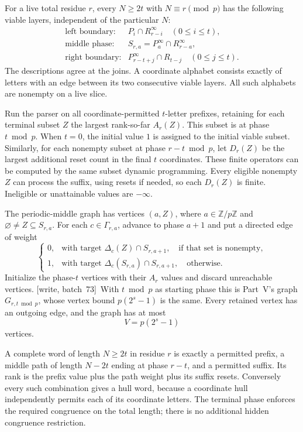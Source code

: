 \documentclass[11pt,letterpaper]{article}
\theoremstyle{definition}
\theoremstyle{remark}
\newcommand{\wsevthree}{\textup{[write, batch~73]}}
\begin{document}
For a live total residue $r$, every $N\ge2t$ with $N\equiv r\pmod p$ has the following viable layers, independent of the particular $N$:
\[
 \begin{array}{ll}
 \text{left boundary:}&P_i\cap R_{r-i}^{\infty}\quad(0\le i\le t),\\[2pt]
 \text{middle phase:}&S_{r,a}=P_a^{\infty}\cap R_{r-a}^{\infty},\\[2pt]
 \text{right boundary:}&P_{r-t+j}^{\infty}\cap R_{t-j}\quad(0\le j\le t).
 \end{array}
\]
The descriptions agree at the joins. A coordinate alphabet consists exactly of letters with an edge between its two consecutive viable layers. All such alphabets are nonempty on a live slice.

Run the parser on all coordinate-permitted $t$-letter prefixes, retaining for each terminal subset $Z$ the largest rank-so-far $A_r(Z)$. This subset is at phase $t\bmod p$. When $t=0$, the initial value $1$ is assigned to the initial viable subset. Similarly, for each nonempty subset at phase $r-t\bmod p$, let $D_r(Z)$ be the largest additional reset count in the final $t$ coordinates. These finite operators can be computed by the same subset dynamic programming. Every eligible nonempty $Z$ can process the suffix, using resets if needed, so each $D_r(Z)$ is finite. Ineligible or unattainable values are $-\infty$.

The periodic-middle graph has vertices $(a,Z)$, where $a\in\mathbb Z/p\mathbb Z$ and $\varnothing\ne Z\subseteq S_{r,a}$. For each $c\in\Gamma_{r,a}$, advance to phase $a+1$ and put a directed edge of weight
\[
 \begin{cases}
 0,&\text{with target }\Delta_c(Z)\cap S_{r,a+1},\quad
                   \text{if that set is nonempty},\\
 1,&\text{with target }\Delta_c(S_{r,a})\cap S_{r,a+1},\quad
                   \text{otherwise}.
 \end{cases}
\]
Initialize the phase-$t$ vertices with their $A_r$ values and discard unreachable vertices.
\wsevthree\ With $t\bmod p$ as starting phase this is Part~V's graph
$G_{r,t\bmod p}$, whose vertex bound $p(2^s-1)$ is the same. Every retained vertex has an outgoing edge, and the graph has at most
\begin{equation}\label{ccc:sc:eq:parser-vertices}
 V=p(2^s-1)
\end{equation}
vertices.

A complete word of length $N\ge2t$ in residue $r$ is exactly a permitted prefix, a middle path of length $N-2t$ ending at phase $r-t$, and a permitted suffix. Its rank is the prefix value plus the path weight plus its suffix resets. Conversely every such combination gives a hull word, because a coordinate hull independently permits each of its coordinate letters. The terminal phase enforces the required congruence on the total length; there is no additional hidden congruence restriction.
\end{document}
